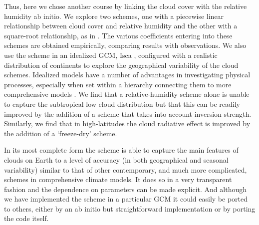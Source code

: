 Thus, here we chose another course by linking the cloud cover with the relative humidity ab initio. We explore two schemes, one with a piecewise linear relationship between cloud cover and relative humidity and the other with a square-root relationship, as in \citet{Sundqvist1989}. The various coefficients entering into these schemes are obtained empirically, comparing results with observations. We also use the scheme in an idealized GCM, Isca \citep{Vallis2018}, configured with a realistic distribution of continents to explore the geographical variability of the cloud schemes. Idealized models have a number of advantages in investigating physical processes, especially when set within a hierarchy connecting them to more comprehensive models \citep[e.g.,][]{Maher2018_hierarchies, Thomson2019}. We find that a relative-humidity scheme alone is unable to capture the subtropical low cloud distribution but that this can be readily improved by the addition of a scheme that takes into account inversion strength. Similarly, we find that in high-latitudes the cloud radiative effect is improved by the addition of a `freeze-dry' scheme. 

In its most complete form the scheme is able to capture the main features of clouds on Earth to a level of accuracy (in both geographical and seasonal variability) similar to that of other contemporary, and much more complicated, schemes in comprehensive climate models. It does so in a very transparent fashion and the dependence on parameters can be made explicit. And although we have implemented the scheme in a particular GCM it could easily be ported to others, either by an ab initio but straightforward implementation or by porting the code itself. 


